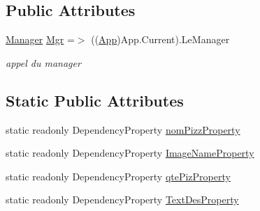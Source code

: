 \subsection*{Public Attributes}
\begin{DoxyCompactItemize}
\item 
\hyperlink{classModele_1_1Manager}{Manager} \hyperlink{classnewPizza1_1_1ucCommandeEnCours_aa17f28ccab15dc9c3334e1e56e4e607b}{Mgr} =$>$ ((\hyperlink{classnewPizza1_1_1App}{App})App.\+Current).Le\+Manager
\begin{DoxyCompactList}\small\item\em appel du manager \end{DoxyCompactList}\end{DoxyCompactItemize}
\subsection*{Static Public Attributes}
\begin{DoxyCompactItemize}
\item 
static readonly Dependency\+Property \hyperlink{classnewPizza1_1_1ucCommandeEnCours_ac049430d839ff86203db5f16ea4c9c98}{nom\+Pizz\+Property}
\item 
static readonly Dependency\+Property \hyperlink{classnewPizza1_1_1ucCommandeEnCours_afbc14ffea85889dd6b9999a531bfc1f7}{Image\+Name\+Property}
\item 
static readonly Dependency\+Property \hyperlink{classnewPizza1_1_1ucCommandeEnCours_a0857d9deff2ce24ae9ffb3e1afe77f4e}{qte\+Piz\+Property}
\item 
static readonly Dependency\+Property \hyperlink{classnewPizza1_1_1ucCommandeEnCours_aa77da1f21c1745c5bfb12ccda860eaff}{Text\+Des\+Property}
\end{DoxyCompactItemize}
